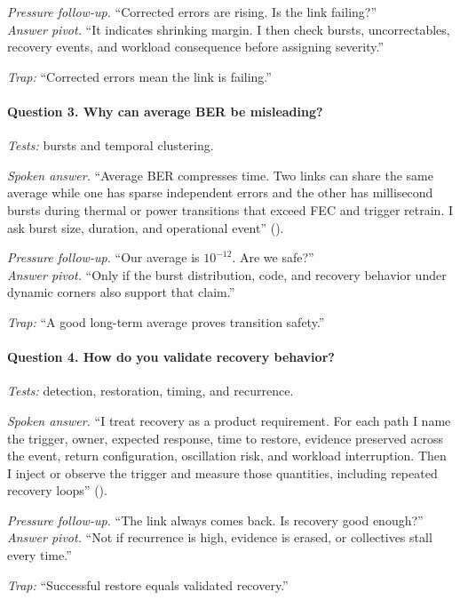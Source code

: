 \textit{Pressure follow-up.} ``Corrected errors are rising. Is the link
failing?''\\
\textit{Answer pivot.} ``It indicates shrinking margin. I then check bursts,
uncorrectables, recovery events, and workload consequence before assigning
severity.''

\textit{Trap:} ``Corrected errors mean the link is failing.''

\paragraph{Question 3. Why can average BER be misleading?}
\textit{Tests:} bursts and temporal clustering.

\textit{Spoken answer.}
``Average BER compresses time. Two links can share the same average while one
has sparse independent errors and the other has millisecond bursts during
thermal or power transitions that exceed FEC and trigger retrain. I ask burst
size, duration, and operational event''
().

\textit{Pressure follow-up.} ``Our average is $10^{-12}$. Are we safe?''\\
\textit{Answer pivot.} ``Only if the burst distribution, code, and recovery
behavior under dynamic corners also support that claim.''

\textit{Trap:} ``A good long-term average proves transition safety.''

\paragraph{Question 4. How do you validate recovery behavior?}
\textit{Tests:} detection, restoration, timing, and recurrence.

\textit{Spoken answer.}
``I treat recovery as a product requirement. For each path I name the trigger,
owner, expected response, time to restore, evidence preserved across the event,
return configuration, oscillation risk, and workload interruption. Then I
inject or observe the trigger and measure those quantities, including repeated
recovery loops'' ().

\textit{Pressure follow-up.} ``The link always comes back. Is recovery good
enough?''\\
\textit{Answer pivot.} ``Not if recurrence is high, evidence is erased, or
collectives stall every time.''

\textit{Trap:} ``Successful restore equals validated recovery.''

